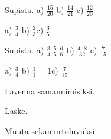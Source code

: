 \begin{tehtavasivu}
\begin{tehtava}
Supista. \quad
a) $\frac{15}{20}$ \qquad b) $\frac{14}{21}$ \qquad c) $\frac{12}{20}$
\begin{vastaus}
a) $\frac{3}{4}$ \qquad b) $\frac{2}{3}$\qquad c) $\frac{3}{5}$
\end{vastaus}
\end{tehtava}

\begin{tehtava}
Supista. \quad
a) $\frac{3\cdot 5 \cdot6}{4\cdot5\cdot 6}$ \qquad b) $\frac{4\cdot 8}{32}$ \qquad c) $\frac{7}{15}$
\begin{vastaus}
a) $\frac{3}{4}$ \qquad b) $\frac{1}{1}=1$\qquad c) $\frac{7}{15}$
\end{vastaus}
\end{tehtava}

\begin{tehtava}
Lavenna samannimisiksi.
\begin{alakohdat}
\end{alakohdat}
\begin{vastaus}
\begin{alakohdat}
\end{alakohdat}
\end{vastaus}
\end{tehtava}

\begin{tehtava}
Laske.
	\begin{alakohdat}
	\end{alakohdat}
	\begin{vastaus}
		\begin{alakohdat}
			\alakohta{$\frac{8}{11}$}
			\alakohta{$\frac{3}{5}$}
			\alakohta{$\frac{7}{6}$}
			\alakohta{$\frac{19}{12}$}
		\end{alakohdat}
	\end{vastaus}
\end{tehtava}

\begin{tehtava}
Muuta sekamurtoluvuksi 
\begin{alakohdatrivi}
\end{alakohdatrivi}
\begin{vastaus}
\begin{alakohdat}
\end{alakohdat}
\end{vastaus}
\end{tehtava}


\end{tehtavasivu}
